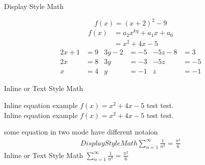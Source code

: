 \documentclass[10pt]{article}
\begin{document}
    \begin{center}
        {\LARGE Display Style Math}\\
    \end{center}
    \[f(x) = (x+2)^2 - 9\]
    \begin{align}
        f(x) & = a_2 x^{ky} + a_1 x +a_0 \nonumber \\
             & = x^2 + 4x - 5
    \end{align}
    \begin{align*}
        2x+1 & = 9 & 3y-2 & = -5 & -5z-8 & = 3 \\
        2x & = 8 & 3y & = -3 & -5z & = -5 \\
        x &= 4 & y &= -1 & z &= -1
    \end{align*}

    \begin{center}
        {\LARGE Inline or Text Style Math}\\
    \end{center}
    Inline equation example $f(x) = x^2 +4x -5$ test test. \\
    Inline equation example \(f(x) = x^2 +4x -5\) test test. \\

    \begin{center}
        {\LARGE some equation in two mode have different notaion}\\
        \begin{align*}
            Display Style Math
            \sum_{n=1}^\infty \frac{1}{n^2} = \frac{\pi^2}{6}
        \end{align*}
        Inline or Text Style Math
        \(\sum_{n=1}^\infty \frac{1}{n^2} = \frac{\pi^2}{6}\)
    \end{center}
\end{document}

